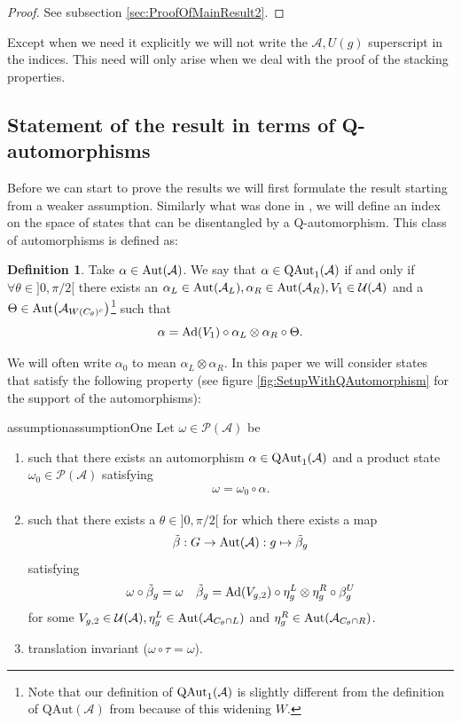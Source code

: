 \documentclass[12pt,a4paper,twoside]{article}
\let\originalleft\left
\let\originalright\right
\renewcommand{\left}{\mathopen{}\mathclose\bgroup\originalleft}
\renewcommand{\right}{\aftergroup\egroup\originalright}
\newcommand{\UU}{\mathcal U}
\newcommand{\PP}{\mathcal P}
\renewcommand{\AA}{\mathcal A}
\newcommand{\Ad}[1]{\textrm{Ad}\left(#1\right)}
\newcommand{\Aut}[1]{\textrm{Aut}\left(#1\right)}
\newcommand{\QAut}[1]{\textrm{QAut}_1\left(#1\right)}
\theoremstyle{definition}
\newtheorem{definition}[theorem]{Definition}
\numberwithin{equation}{section}
\begin{document}
\begin{proof}
	See subsection \ref{sec:ProofOfMainResult2}.
\end{proof}
Except when we need it explicitly we will not write the $\AA,U(g)$ superscript in the indices. This need will only arise when we deal with the proof of the stacking properties.
\subsection{Statement of the result in terms of Q-automorphisms}\label{sec:Results_2}

Before we can start to prove the results we will first formulate the result starting from a weaker assumption. Similarly what was done in \cite{ogata2021h3gmathbb}, we will define an index on the space of states that can be disentangled by a Q-automorphism. This class of automorphisms is defined as:
\begin{definition}
	Take $\alpha\in\Aut{\AA}$. We say that $\alpha\in\QAut{\AA}$ if and only if $\forall\theta\in]0,\pi/2[$ there exists an $\alpha_L\in\Aut{\AA_L},\alpha_R\in\Aut{\AA_R},V_1\in\UU(\AA)$ and a $\Theta\in\Aut{\AA_{W(C_\theta)^c}}$\footnote{Note that our definition of $\QAut{\AA}$ is slightly different from the definition of $\textrm{QAut}(\AA)$ from \cite{ogata2021h3gmathbb} because of this widening $W$.} such that
	\begin{equation}
		\alpha=\Ad{V_1}\circ\alpha_L\otimes\alpha_R\circ\Theta.
	\end{equation}
\end{definition}
We will often write $\alpha_0$ to mean $\alpha_L\otimes\alpha_R$. In this paper we will consider states that satisfy the following property (see figure \ref{fig:SetupWithQAutomorphism} for the support of the automorphisms):
\begin{restatable}{assumption}{assumptionOne}\label{assumption}
	Let $\omega\in\PP(\AA)$ be
	\begin{enumerate}
		\item such that there exists an automorphism $\alpha\in\QAut{\AA}$ and a product state $\omega_0\in\PP(\AA)$ satisfying
		\begin{align}
			\omega=\omega_0\circ\alpha.
		\end{align}
		\item such that there exists a $\theta\in]0,\pi/2[$ for which there exists a map
		\begin{equation}
			\tilde\beta:G\rightarrow\Aut{\AA}:g\mapsto\tilde\beta_g
		\end{equation}
		satisfying
		\begin{align}
			\omega\circ\tilde\beta_g&=\omega&\tilde\beta_g=\Ad{V_{g,2}}\circ\eta^L_g\otimes\eta^R_g\circ\beta^U_g
		\end{align}
		for some $V_{g,2}\in\UU(\AA),\eta^L_g\in\Aut{\AA_{C_\theta\cap L}}$ and $\eta^R_g\in\Aut{\AA_{C_\theta\cap R}}$.
		\item translation invariant ($\omega\circ\tau=\omega$).
	\end{enumerate}
\end{restatable}
\end{document}
